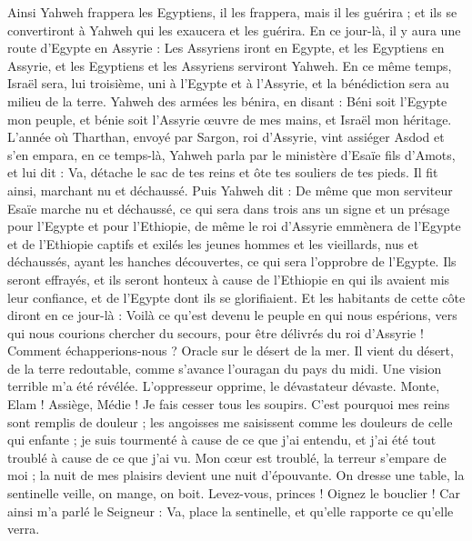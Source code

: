 \begin{multicols}{2}
Ainsi Yahweh frappera les Egyptiens, il les frappera, mais il les guérira ; et ils se convertiront à Yahweh qui les exaucera et les guérira.
En ce jour-là, il y aura une route d'Egypte en Assyrie : Les Assyriens iront en Egypte, et les Egyptiens en Assyrie, et les Egyptiens et les Assyriens serviront Yahweh.
En ce même temps, Israël sera, lui troisième, uni à l'Egypte et à l'Assyrie, et la bénédiction sera au milieu de la terre.
Yahweh des armées les bénira, en disant : Béni soit l'Egypte mon peuple, et bénie soit l'Assyrie œuvre de mes mains, et Israël mon héritage.
\VerseOne{}L'année où Tharthan, envoyé par Sargon, roi d'Assyrie, vint assiéger Asdod et s'en empara,
en ce temps-là, Yahweh parla par le ministère d'Esaïe fils d'Amots, et lui dit : Va, détache le sac de tes reins et ôte tes souliers de tes pieds. Il fit ainsi, marchant nu et déchaussé.
Puis Yahweh dit : De même que mon serviteur Esaïe marche nu et déchaussé, ce qui sera dans trois ans un signe et un présage pour l'Egypte et pour l'Ethiopie,
de même le roi d'Assyrie emmènera de l'Egypte et de l'Ethiopie captifs et exilés les jeunes hommes et les vieillards, nus et déchaussés, ayant les hanches découvertes, ce qui sera l'opprobre de l'Egypte.
Ils seront effrayés, et ils seront honteux à cause de l'Ethiopie en qui ils avaient mis leur confiance, et de l'Egypte dont ils se glorifiaient.
Et les habitants de cette côte diront en ce jour-là : Voilà ce qu'est devenu le peuple en qui nous espérions, vers qui nous courions chercher du secours, pour être délivrés du roi d'Assyrie ! Comment échapperions-nous ?
\VerseOne{}Oracle sur le désert de la mer. Il vient du désert, de la terre redoutable, comme s'avance l'ouragan du pays du midi.
Une vision terrible m'a été révélée. L'oppresseur opprime, le dévastateur dévaste. Monte, Elam ! Assiège, Médie ! Je fais cesser tous les soupirs.
C'est pourquoi mes reins sont remplis de douleur ; les angoisses me saisissent comme les douleurs de celle qui enfante ; je suis tourmenté à cause de ce que j'ai entendu, et j'ai été tout troublé à cause de ce que j'ai vu.
Mon cœur est troublé, la terreur s'empare de moi ; la nuit de mes plaisirs devient une nuit d'épouvante.
On dresse une table, la sentinelle veille, on mange, on boit. Levez-vous, princes ! Oignez le bouclier !
Car ainsi m'a parlé le Seigneur : Va, place la sentinelle, et qu'elle rapporte ce qu'elle verra.

\end{multicols}
